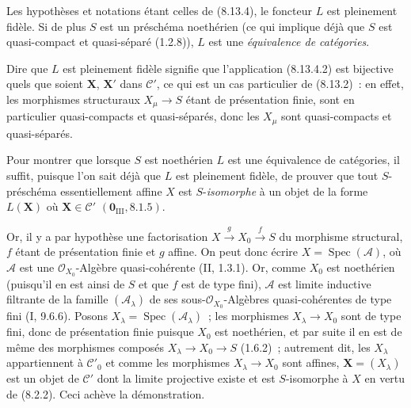 \begin{proposition}[8.13.5]
\label{IV.8.13.5-fr}
Les hypothèses et notations étant celles de (8.13.4), le foncteur $L$ est
pleinement fidèle. Si de plus $S$ est un préschéma noethérien (ce qui implique
déjà que $S$ est quasi-compact et quasi-séparé (1.2.8)), $L$ est une
\emph{équivalence de catégories}.
\end{proposition}

Dire que $L$ est pleinement fidèle signifie que l'application (8.13.4.2) est
bijective quels que soient $\mathbf X$, $\mathbf X'$ dans $\mathcal C'$, ce
qui est un cas particulier de (8.13.2)~: en effet, les morphismes structuraux
$X_\mu\to S$ étant de présentation finie, sont en particulier quasi-compacts
et quasi-séparés, donc les $X_\mu$ sont quasi-compacts et quasi-séparés.

Pour montrer que lorsque $S$ est noethérien $L$ est une équivalence de
catégories, il suffit, puisque l'on sait déjà que $L$ est pleinement fidèle,
de prouver que tout $S$-préschéma essentiellement affine $X$ est
$S$-\emph{isomorphe} à un objet de la forme $L(\mathbf X)$ où
$\mathbf X\in\mathcal C'$ $(\mathbf 0_{\mathrm{III}},8.1.5)$.

Or, il y a par hypothèse une factorisation
$X\xrightarrow{g}X_0\xrightarrow{f}S$ du morphisme structural, $f$ étant de
présentation finie et $g$ affine. On peut donc écrire
$X=\operatorname{Spec}(\mathcal A)$, où $\mathcal A$ est une
$\mathcal O_{X_0}$-Algèbre quasi-cohérente (II, 1.3.1). Or, comme $X_0$ est
noethérien (puisqu'il en est ainsi de $S$ et que $f$ est de type fini),
$\mathcal A$ est limite inductive filtrante de la famille
$(\mathcal A_\lambda)$ de ses sous-$\mathcal O_{X_0}$-Algèbres quasi-cohérentes
de type fini (I, 9.6.6). Posons
$X_\lambda=\operatorname{Spec}(\mathcal A_\lambda)$~; les morphismes
$X_\lambda\to X_0$ sont de type fini, donc de présentation finie puisque
$X_0$ est noethérien, et par suite il en est de même des morphismes composés
$X_\lambda\to X_0\to S$ (1.6.2)~; autrement dit, les $X_\lambda$
appartiennent à $\mathcal C'_0$ et comme les morphismes $X_\lambda\to X_0$
sont affines, $\mathbf X=(X_\lambda)$ est un objet de $\mathcal C'$ dont la
limite projective existe et est $S$-isomorphe à $X$ en vertu de (8.2.2). Ceci
achève la démonstration.

